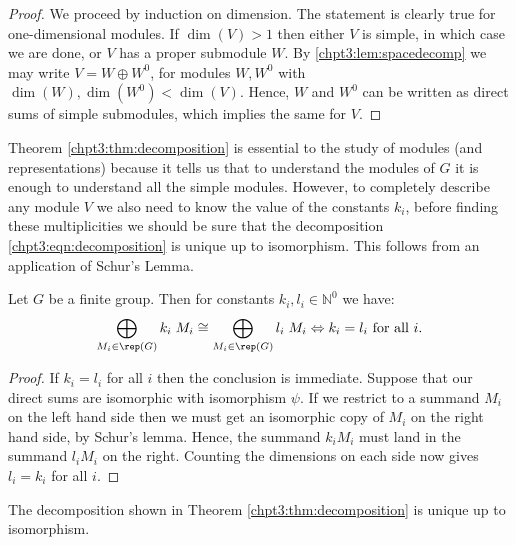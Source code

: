 \documentclass[11pt]{report}
\begin{document}
\begin{proof}
	
	
	
	
	
	
	
	
	
	
	
	We proceed by induction on dimension. The statement is clearly true for one-dimensional modules. If $\dim(V) >1$ then either $V$ is simple, in which case we are done, or $V$ has a proper submodule $W$. By \ref{chpt3:lem:spacedecomp} we may write $V = W \oplus W^{0}$, for modules $W,W^{0}$ with $\dim(W), \dim(W^{0}) < \dim(V)$. Hence, $W$ and $W^{0}$ can be written as direct sums of simple submodules, which implies the same for $V$.
\end{proof}


Theorem \ref{chpt3:thm:decomposition} is essential 
to the study of modules (and representations) because it tells us that to understand the  
modules of $G$ it is enough to understand all the simple modules. However, to completely describe any module $V$ we also need to know the value of the constants $k_{i}$, before 
finding these multiplicities we should be sure that the decomposition \eqref{chpt3:eqn:decomposition} is unique 
up to isomorphism. This follows from an application of Schur's Lemma.

\begin{lemma}
	\label{chpt3:lem:unique}
	Let $G$ be a finite group. Then for constants $k_{i},l_{i} \in\mathbb{N}^{0}$ 
	we have:
	\[ \bigoplus_{M_{i}\in \rep(G)} k_{i} \; M_{i} \cong \bigoplus_{M_{i} \in 
		\rep(G)} l_{i} \; 	M_{i} \Leftrightarrow k_{i} = l_{i} \textnormal{ for all $i$}.\]
\end{lemma}

\begin{proof}
	If $k_{i}=l_{i}$ for all $i$ then the conclusion is immediate. Suppose that our direct sums are isomorphic with isomorphism $\psi$. If we restrict to a summand $M_{i}$ on the left hand side then we must get an isomorphic copy of $M_{i}$ on the right hand side, by Schur's lemma. Hence, the summand $k_{i}M_{i}$ must land in the summand $l_{i} M_{i}$ on the right. Counting the dimensions on each side now gives $l_{i}= k_{i}$ for all $i$.
	
	
	
	
	
	
\end{proof}

\begin{corollary}
	\label{chpt3:cor:decomposition}
	The decomposition shown in Theorem \ref{chpt3:thm:decomposition} is 
	unique up to isomorphism. 
\end{corollary}
\end{document}
